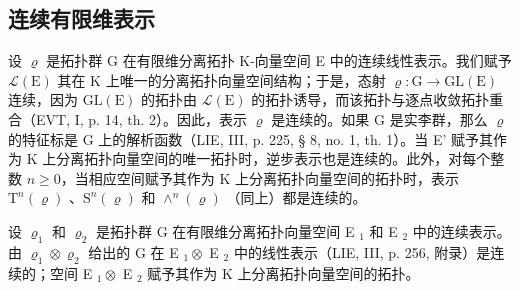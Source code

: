 \subsection{连续有限维表示}

设 \(\varrho\) 是拓扑群 G 在有限维分离拓扑 K-向量空间 E 中的连续线性表示。我们赋予 \(\mathcal{L}(\mathrm{E})\) 其在 K 上唯一的分离拓扑向量空间结构；于是，态射 \(\varrho\colon\mathrm{G}\to\mathrm{GL}(\mathrm{E})\) 连续，因为 \(\mathrm{GL}(\mathrm{E})\) 的拓扑由 \(\mathcal{L}(\mathrm{E})\) 的拓扑诱导，而该拓扑与逐点收敛拓扑重合（EVT, I, p. 14, th. 2）。因此，表示 \(\varrho\) 是连续的。如果 G 是实李群，那么 \(\varrho\) 的特征标是 G 上的解析函数（LIE, III, p. 225, § 8, no. 1, th. 1）。当 E' 赋予其作为 K 上分离拓扑向量空间的唯一拓扑时，逆步表示也是连续的。此外，对每个整数 \(n\geqslant0\)，当相应空间赋予其作为 K 上分离拓扑向量空间的拓扑时，表示 \(\mathrm{T}^{n}(\varrho)\) 、\(\mathrm{S}^{n}(\varrho)\) 和 \(\wedge^{n}(\varrho)\) （同上）都是连续的。

设 \(\varrho_{1}\) 和 \(\varrho_{2}\) 是拓扑群 G 在有限维分离拓扑向量空间 E \(_{1}\) 和 E \(_{2}\) 中的连续表示。由 \(\varrho_{1} \otimes \varrho_{2}\) 给出的 G 在 E \(_{1} \otimes\) E \(_{2}\) 中的线性表示（LIE, III, p. 256, 附录）是连续的；空间 E \(_{1} \otimes\) E \(_{2}\) 赋予其作为 K 上分离拓扑向量空间的拓扑。

